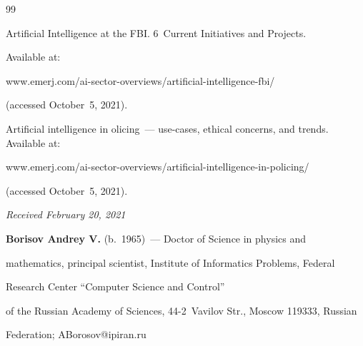 {{\begin{thebibliography}{99}


Artificial Intelligence at the FBI. 6~Current Initiatives and Projects.


 Available at:


     {\sf www.emerj.com/ai-sector-overviews/artificial-intelligence-fbi/}


(accessed October~5, 2021).




Artificial intelligence in olicing~--- use-cases, ethical concerns, and trends. Available at:


{\sf www.emerj.com/ai-sector-overviews/artificial-intelligence-in-policing/}


(accessed October~5, 2021).


\end{thebibliography}


} }





\vspace*{-6pt}





\hfill{\small\textit{Received February 20, 2021}}





\vspace*{-12pt}





\Contr





\noindent


\textbf{Borisov Andrey V.} (b.\ 1965)~--- Doctor of Science in physics and


mathematics, principal scientist, Institute of Informatics Problems, Federal


Research Center ``Computer Science and Control''


of the Russian Academy of Sciences, 44-2~Vavilov Str., Moscow 119333, Russian


Federation; \mbox{ABorosov@ipiran.ru}





\vspace*{3pt}





\noindent


